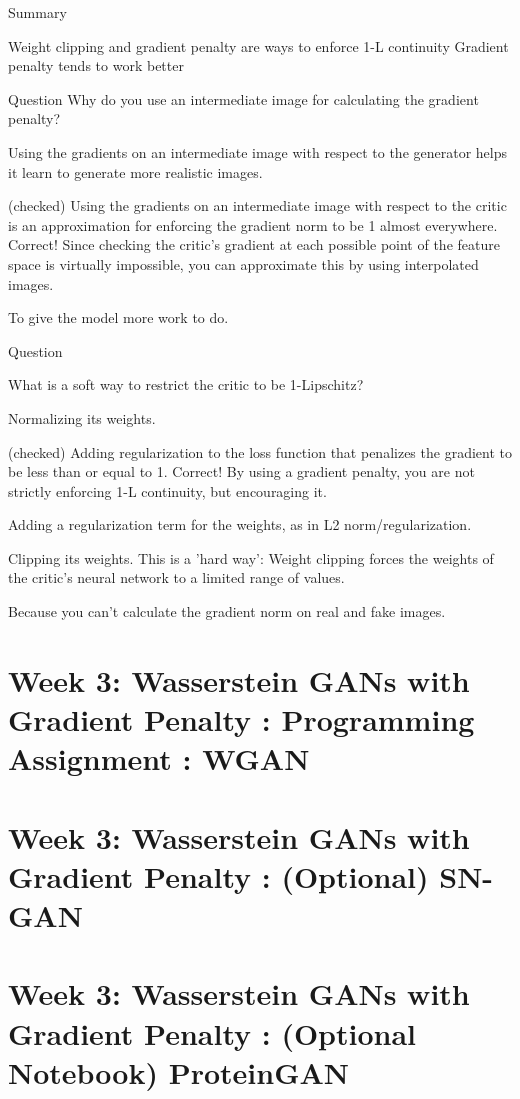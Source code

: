\documentclass[11pt, onecolumn]{article}
\begin{document}
Summary

Weight clipping and gradient penalty are ways to enforce 1-L continuity
Gradient penalty tends to work better

Question
Why do you use an intermediate image for calculating the gradient penalty?

Using the gradients on an intermediate image with respect to the generator helps it learn to generate more realistic images.

(checked) Using the gradients on an intermediate image with respect to the critic is an approximation for enforcing the gradient norm to be 1 almost everywhere.
Correct! Since checking the critic’s gradient at each possible point of the feature space is virtually impossible, you can approximate this by using interpolated images.

To give the model more work to do.

Question

What is a soft way to restrict the critic to be 1-Lipschitz?

Normalizing its weights.

(checked) Adding regularization to the loss function that penalizes the gradient to be less than or equal to 1.
Correct! By using a gradient penalty, you are not strictly enforcing 1-L continuity, but encouraging it.

Adding a regularization term for the weights, as in L2 norm/regularization.

Clipping its weights.
This is a 'hard way': Weight clipping forces the weights of the critic’s neural network to a limited range of values.

Because you can’t calculate the gradient norm on real and fake images.


\section{Week 3: Wasserstein GANs with Gradient Penalty : Programming Assignment : WGAN}


\section{Week 3: Wasserstein GANs with Gradient Penalty : (Optional) SN-GAN}


\section{Week 3: Wasserstein GANs with Gradient Penalty : (Optional Notebook) ProteinGAN}
\end{document}
